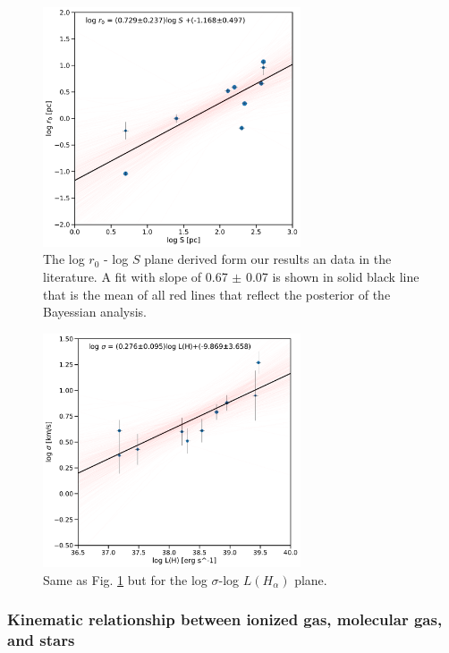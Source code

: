 \documentclass[fleqn,usenatbib, useAMS, a4paper]{mnras}
\begin{document}


\begin{figure}
\centering 
\includegraphics[width=3in]{Figures/rvsS}
\caption{The log \(r_0\) - log \(S\) plane derived form our results an data in the literature. A fit with slope of 0.67 $\pm$ 0.07 is shown in solid black line that is the mean of all red lines that reflect the posterior of the Bayessian analysis. }
\label{fig:rvsR}
\end{figure}

\begin{figure}
\centering 
\includegraphics[width=3in]{Figures/svsL}
\caption{Same as Fig. \ref{fig:rvsR} but for the log $\sigma$-log $L(H_{\alpha})$ plane.}
\label{fig:sigvsl}
\end{figure}


\subsubsection{Kinematic relationship between ionized gas, molecular gas, and stars}
\label{sec:kinem-rela-betw}
\end{document}
